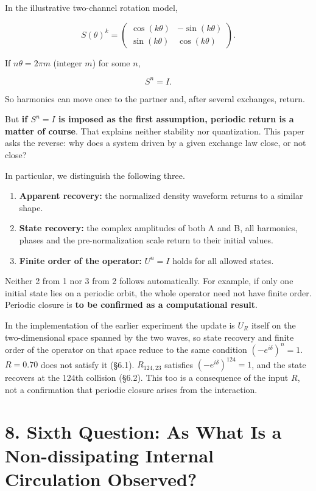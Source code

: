\documentclass[
  a4paper,
]{article}
\providecommand{\tightlist}{%
  \setlength{\itemsep}{0pt}\setlength{\parskip}{0pt}}
\begin{document}
In the illustrative two-channel rotation model,

\[
S(\theta)^k=
\begin{pmatrix}
\cos(k\theta)&-\sin(k\theta)\\
\sin(k\theta)&\cos(k\theta)
\end{pmatrix}.
\]

If \(n\theta=2\pi m\) (integer \(m\)) for some \(n\),

\[
S^n=I.
\]

So harmonics can move once to the partner and, after several exchanges,
return.

But \textbf{if \(S^n=I\) is imposed as the first assumption, periodic
return is a matter of course}. That explains neither stability nor
quantization. This paper asks the reverse: why does a system driven by a
given exchange law close, or not close?

In particular, we distinguish the following three.

\begin{enumerate}
\def\labelenumi{\arabic{enumi}.}
\tightlist
\item
  \textbf{Apparent recovery:} the normalized density waveform returns to
  a similar shape.
\item
  \textbf{State recovery:} the complex amplitudes of both A and B, all
  harmonics, phases and the pre-normalization scale return to their
  initial values.
\item
  \textbf{Finite order of the operator:} \(U^n=I\) holds for all allowed
  states.
\end{enumerate}

Neither 2 from 1 nor 3 from 2 follows automatically. For example, if
only one initial state lies on a periodic orbit, the whole operator need
not have finite order. Periodic closure is \textbf{to be confirmed as a
computational result}.

In the implementation of the earlier experiment the update is \(U_R\)
itself on the two-dimensional space spanned by the two waves, so state
recovery and finite order of the operator on that space reduce to the
same condition \((-e^{i\delta})^n=1\). \(R=0.70\) does not satisfy it
(§6.1). \(R_{124,23}\) satisfies \((-e^{i\delta})^{124}=1\), and the
state recovers at the 124th collision (§6.2). This too is a consequence
of the input \(R\), not a confirmation that periodic closure arises from
the interaction.

\section{8. Sixth Question: As What Is a Non-dissipating Internal
Circulation
Observed?}\label{sixth-question-as-what-is-a-non-dissipating-internal-circulation-observed}
\end{document}
